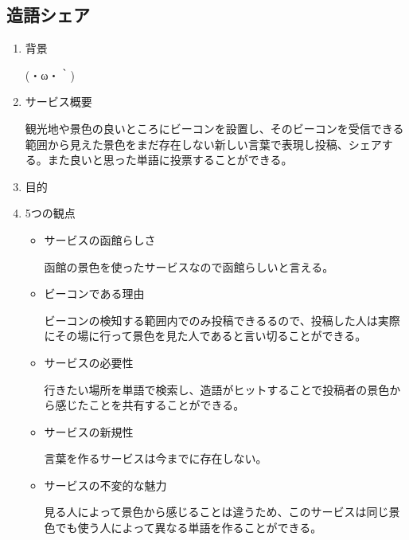 \subsection{造語シェア}
\begin{enumerate}
    \item 背景
    \par (・ω・｀)
    \item サービス概要
    \par 観光地や景色の良いところにビーコンを設置し、そのビーコンを受信できる範囲から見えた景色をまだ存在しない新しい言葉で表現し投稿、シェアする。また良いと思った単語に投票することができる。
    \item 目的
    \par 
    \item 5つの観点
    \begin{itemize}
        \item サービスの函館らしさ
        \par 函館の景色を使ったサービスなので函館らしいと言える。
        \item ビーコンである理由
        \par ビーコンの検知する範囲内でのみ投稿できるるので、投稿した人は実際にその場に行って景色を見た人であると言い切ることができる。
        \item サービスの必要性
        \par 行きたい場所を単語で検索し、造語がヒットすることで投稿者の景色から感じたことを共有することができる。
        \item サービスの新規性
        \par 言葉を作るサービスは今までに存在しない。
        \item サービスの不変的な魅力
        \par 見る人によって景色から感じることは違うため、このサービスは同じ景色でも使う人によって異なる単語を作ることができる。
    \end{itemize}
\end{enumerate}

